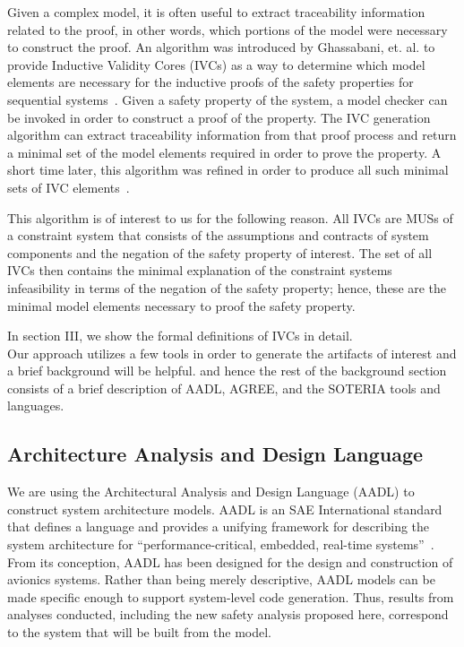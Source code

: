 Given a complex model, it is often useful to extract traceability information related to the proof, in other words, which portions of the model were necessary to construct the proof. An algorithm was introduced by Ghassabani, et. al. to provide Inductive Validity Cores (IVCs) as a way to determine which model elements are necessary for the inductive proofs of the safety properties for sequential systems~\cite{GhassabaniGW16}. Given a safety property of the system, a model checker can be invoked in order to construct a proof of the property. The IVC generation algorithm can extract traceability information from that proof process and return a minimal set of the model elements required in order to prove the property. A short time later, this algorithm was refined in order to produce all such minimal sets of IVC elements~\cite{Ghassabani2017EfficientGO}. 

This algorithm is of interest to us for the following reason. All IVCs are MUSs of a constraint system that consists of the assumptions and contracts of system components and the negation of the safety property of interest. The set of all IVCs then contains the minimal explanation of the constraint systems infeasibility in terms of the negation of the safety property; hence, these are the minimal model elements necessary to proof the safety property.

In section III, we show the formal definitions of IVCs in detail. \\

Our approach utilizes a few tools in order to generate the artifacts of interest and a brief background will be helpful. and hence the rest of the background section consists of a brief description of AADL, AGREE, and the SOTERIA tools and languages. 

\subsection{Architecture Analysis and Design Language}
We are using the Architectural Analysis and Design Language (AADL) to construct system architecture models.  AADL is an SAE International standard that defines a language and provides a unifying framework for describing the system architecture for ``performance-critical, embedded, real-time systems''~\cite{AADL_Standard,FeilerModelBasedEngineering2012}. From its conception, AADL has been designed for the design and construction of avionics systems.  Rather than being merely descriptive, AADL models can be made specific enough to support system-level code generation.  Thus, results from analyses conducted, including the new safety analysis proposed here, correspond to the system that will be built from the model.  

